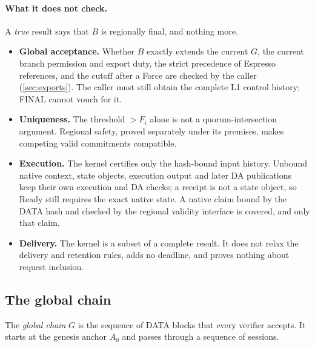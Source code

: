 \documentclass[11pt,a4paper]{article}
\newcommand{\defterm}[1]{\textcolor{rrBlue}{\textit{#1}}}
\begin{document}
\paragraph{What it does not check.}
A \emph{true} result says that $B$ is regionally final, and nothing more.
\begin{itemize}[itemsep=2pt]
\item \textbf{Global acceptance.} Whether $B$ exactly extends the
current $G$, the current branch permission and export duty, the strict
precedence of Espresso references, and the cutoff after a
Force are checked by the caller (\cref{sec:exports}). The caller must
still obtain the complete L1 control history; FINAL cannot vouch
for it.
\item \textbf{Uniqueness.} The threshold $>F_i$ alone is not a
quorum-intersection argument. Regional safety, proved separately under
its premises, makes competing valid commitments compatible.
\item \textbf{Execution.} The kernel certifies only the hash-bound
input history. Unbound native context, state objects, execution output
and later DA publications keep their own execution and DA
checks; a receipt is not a state object, so Ready still requires the
exact native state. A native claim bound by the DATA hash and checked by
the regional validity interface is covered, and only that claim.
\item \textbf{Delivery.} The kernel is a subset of a complete result.
It does not relax the delivery and retention rules, adds no deadline,
and proves nothing about request inclusion.
\end{itemize}

\subsection{The global chain}
\label{sec:global-finality}
\label{sec:global-chain}
The \defterm{global chain} $G$ is the sequence of DATA blocks that every
verifier accepts. It starts at the genesis anchor $A_0$ and passes
through a sequence of sessions.
\end{document}
